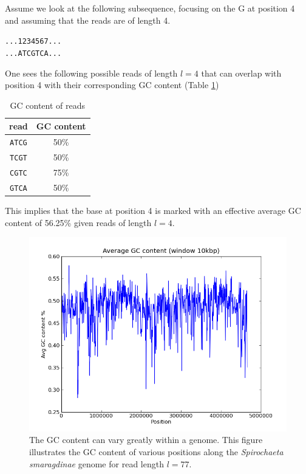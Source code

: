\documentclass[phd,tocprelim]{cornell}
\begin{document}
Assume we look at the following subsequence, focusing on the G at position 4 and assuming that the reads are of length 4.

\singlespacing
\begin{center}
\texttt{...1234567...\\
...ATCGTCA...}
\end{center}
\normalspacing

One sees the following possible reads of length $l=4$ that can overlap with position 4 with their corresponding GC content (Table \ref{GCcontTable})

\begin{table}[h]
    \label{GCcontTable}
    \caption{GC content of reads}
\begin{center}
\begin{tabular}{c|c}
    read & GC content \\
    \hline
    \texttt{ATCG} & 50\% \\
    \texttt{TCGT} & 50\% \\
    \texttt{CGTC} & 75\% \\
    \texttt{GTCA} & 50\%
\end{tabular}
\end{center}
\end{table}

This implies that the base at position 4 is marked with an effective average GC content of 56.25\% given reads of length $l=4$.

\begin{figure}[hptb]
    \centerline{\includegraphics[width=\textwidth]{figures/ALE/spiroGC.png}}
    \caption[GC content of {\it Spirochaeta smaragdinae}]{The GC content can vary greatly within a genome. This figure illustrates the GC content of various positions along the {\it Spirochaeta smaragdinae} genome for read length $l=77$.}\label{fig:GC2}
\end{figure}
\end{document}
